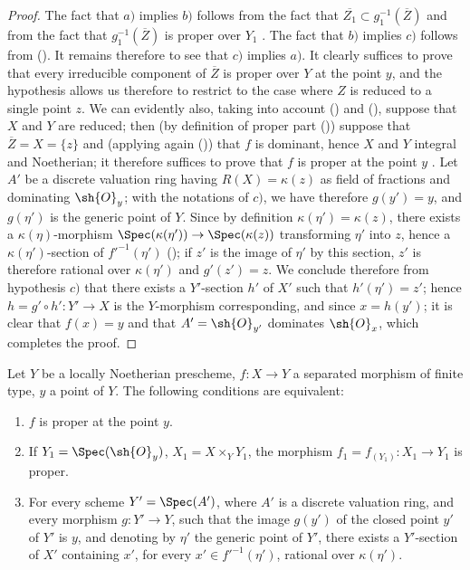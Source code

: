 \begin{proof}
The fact that $a)$ implies $b)$ follows from the fact that $\overline{Z_1}\subset g_1^{-1}(\overline{Z})$ and from the fact that $g_1^{-1}(\overline{Z})$ is proper over $Y_1$ .
The fact that $b)$ implies $c)$ follows from ().
It remains therefore to see that $c)$ implies $a)$.
It clearly suffices to prove that every irreducible component of $\overline{Z}$ is proper over $Y$ at the point $y$, and the hypothesis allows us therefore to restrict to the case where $Z$ is reduced to a single point $z$.
We can evidently also, taking into account () and (), suppose that $X$ and $Y$ are reduced; then (by definition of proper part ()) suppose that $\overline{Z}=X=\{z\}$ and (applying again ()) that $f$ is dominant, hence $X$ and $Y$ integral and Noetherian; it therefore suffices to prove that $f$ is proper at the point $y$ .
Let $A'$ be a discrete valuation ring having $R(X)=\kappa(z)$ as field of fractions and dominating $\sh{O}_y$; with the notations of $c)$, we have therefore $g(y')=y$, and $g(\eta')$ is the generic point of $Y$.
Since by definition $\kappa(\eta')=\kappa(z)$, there exists a $\kappa(\eta)$-morphism $\Spec(\kappa(\eta'))\to\Spec(\kappa(z))$ transforming $\eta'$ into $z$, hence a $\kappa(\eta')$-section of $f'^{-1}(\eta')$ (); if $z'$ is the image of $\eta'$ by this section, $z'$ is therefore rational over $\kappa(\eta')$ and $g'(z')=z$.
We conclude therefore from hypothesis $c)$ that there exists a $Y'$-section $h'$ of $X'$ such that $h'(\eta')=z'$; hence $h=g'\circ h':Y'\to X$ is the $Y$-morphism corresponding, and since $x=h(y')$; it is clear that $f(x)=y$ and that $A'=\sh{O}_{y'}$ dominates $\sh{O}_x$, which completes the proof.
\end{proof}

\begin{corollary}[15.7.5]
\label{IV.15.7.5}
Let $Y$ be a locally Noetherian prescheme, $f:X\to Y$ a separated morphism of finite type, $y$ a point of $Y$.
The following conditions are equivalent:
\begin{enumerate}[label=\emph{\alph*)}]
  \item $f$ is proper at the point $y$.
  \item If $Y_1=\Spec(\sh{O}_y)$, $X_1=X\times_Y Y_1$, the morphism $f_1=f_{(Y_1)}:X_1\to Y_1$ is proper.
  \item For every scheme $Y'=\Spec(A')$, where $A'$ is a discrete valuation ring, and every morphism $g:Y'\to Y$, such that the image $g(y')$ of the closed point $y'$ of $Y'$ is $y$, and denoting by $\eta'$ the generic point of $Y'$, there exists a $Y'$-section of $X'$ containing $x'$, for every $x'\in f'^{-1}(\eta')$, rational over $\kappa(\eta')$.
\end{enumerate}
\end{corollary}

